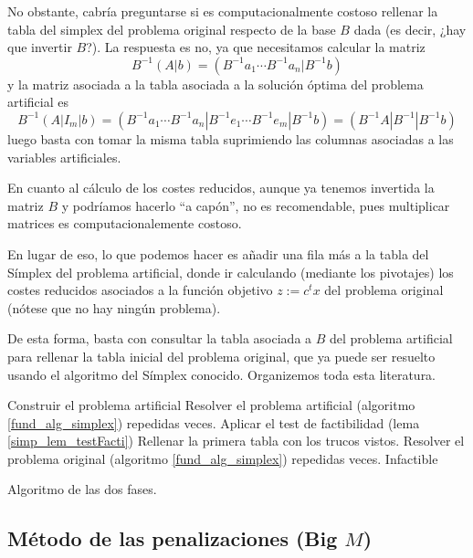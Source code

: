 No obstante, cabría preguntarse si es computacionalmente costoso rellenar la tabla del simplex del problema original respecto de la base $B$ dada (es decir, ¿hay que invertir $B$?). La respuesta es no, ya que necesitamos calcular la matriz
\begin{equation*}
	B^{-1}(A|b)=(B^{-1}a_1\cdots B^{-1}a_n|B^{-1}b)
\end{equation*}
y la matriz asociada a la tabla asociada a la solución óptima del problema artificial es
\begin{equation*}
	B^{-1}(A|I_m|b)=(B^{-1}a_1\cdots B^{-1}a_n|B^{-1}e_1\cdots B^{-1}e_m|B^{-1}b)=(B^{-1}A|B^{-1}|B^{-1}b)
\end{equation*}
luego basta con tomar la misma tabla suprimiendo las columnas asociadas a las variables artificiales.

En cuanto al cálculo de los costes reducidos, aunque ya tenemos invertida la matriz $B$ y podríamos hacerlo ``a capón'', no es recomendable, pues multiplicar matrices es computacionalemente costoso.

En lugar de eso, lo que podemos hacer es añadir una fila más a la tabla del Símplex del problema artificial, donde ir calculando (mediante los pivotajes) los costes reducidos asociados a la función objetivo $z:=c^tx$ del problema original (nótese que no hay ningún problema).

De esta forma, basta con consultar la tabla asociada a $B$ del problema artificial para rellenar la tabla inicial del problema original, que ya puede ser resuelto usando el algoritmo del Símplex conocido. Organizemos toda esta literatura.
\begin{algorithm}[H]
	\begin{algorithmic}[1]
		\STATE{}
			\STATE Construir el problema artificial
			\STATE Resolver el problema artificial (algoritmo \ref{fund_alg_simplex}) repedidas veces.
			\STATE Aplicar el test de factibilidad (lema \ref{simp_lem_testFacti})
				\STATE{}
				\STATE Rellenar la primera tabla con los trucos vistos.
				\STATE Resolver el problema original (algoritmo \ref{fund_alg_simplex}) repedidas veces.
			\ELSE
				\RETURN Infactible
			\ENDIF
	\end{algorithmic}
	\caption{Algoritmo de las dos fases.}\label{simp_alg_dosFases}
\end{algorithm}
\subsection{Método de las penalizaciones (Big $M$)}
